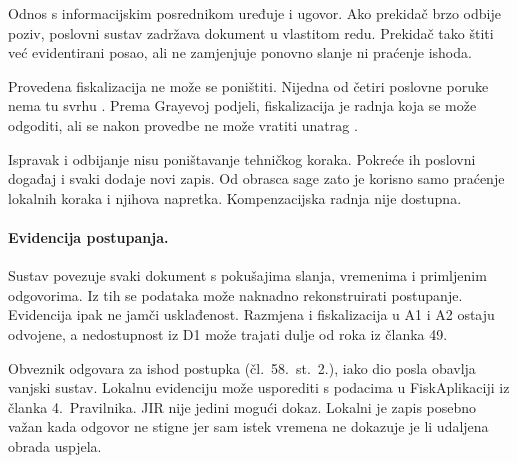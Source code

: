 Odnos s informacijskim posrednikom uređuje i ugovor. Ako prekidač brzo
odbije poziv, poslovni sustav zadržava dokument u vlastitom redu. Prekidač
tako štiti već evidentirani posao, ali ne zamjenjuje ponovno slanje ni
praćenje ishoda.

Provedena fiskalizacija ne može se poništiti. Nijedna od četiri poslovne
poruke nema tu svrhu \cite{pu2026tehspec}. Prema Grayevoj podjeli,
fiskalizacija je radnja koja se može odgoditi, ali se nakon provedbe ne može
vratiti unatrag \cite{gray1981transaction}.

Ispravak i odbijanje nisu poništavanje tehničkog koraka. Pokreće ih poslovni
događaj i svaki dodaje novi zapis. Od obrasca sage zato je korisno samo
praćenje lokalnih koraka i njihova napretka. Kompenzacijska radnja nije
dostupna.

\paragraph{Evidencija postupanja.}
Sustav povezuje svaki dokument s pokušajima slanja, vremenima i primljenim
odgovorima. Iz tih se podataka može naknadno rekonstruirati postupanje.
Evidencija ipak ne jamči usklađenost. Razmjena i fiskalizacija u A1 i A2
ostaju odvojene, a nedostupnost iz D1 može trajati dulje od roka iz članka
49.

Obveznik odgovara za ishod postupka (čl.~58.~st.~2.), iako dio posla obavlja
vanjski sustav. Lokalnu evidenciju može usporediti s podacima u
FiskAplikaciji iz članka 4.\ Pravilnika. JIR nije jedini mogući dokaz.
Lokalni je zapis posebno važan kada odgovor ne stigne jer sam istek vremena
ne dokazuje je li udaljena obrada uspjela.
